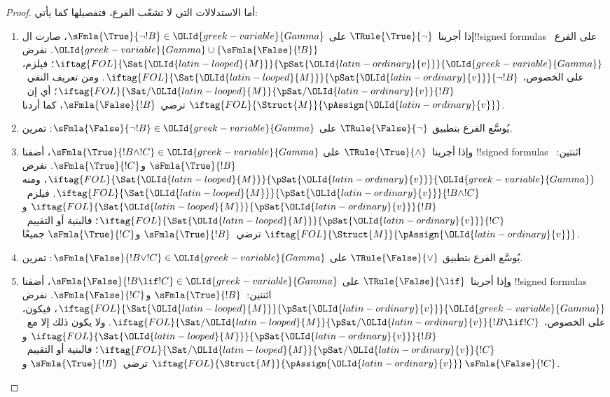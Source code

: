 \documentclass[../../../include/open-logic-section]{subfiles}
\begin{document}
\begin{proof}
أما الاستدلالات التي لا تشعّب الفرع، فتفصيلها كما يأتي:
\begin{enumerate}
\item إذا أجرينا~$\TRule{\True}{\lnot}$ على
  $\sFmla{\True}{\lnot !B} \in {\OLId{greek-variable}{Gamma}}$، صارت
  ال!!{signed formula}s على الفرع~${\OLId{greek-variable}{Gamma}} \cup
  \{\sFmla{\False}{!B}\}$. نفرض
  $\iftag{FOL}{\Sat{{\OLId{latin-looped}{M}}}}{\pSat{{\OLId{latin-ordinary}{v}}}}{{\OLId{greek-variable}{Gamma}}}$؛ فيلزم، على الخصوص،
  $\iftag{FOL}{\Sat{{\OLId{latin-looped}{M}}}}{\pSat{{\OLId{latin-ordinary}{v}}}}{\lnot !B}$.
  ومن تعريف النفي~$\iftag{FOL}{\Sat/{{\OLId{latin-looped}{M}}}}{\pSat/{{\OLId{latin-ordinary}{v}}}}{!B}$؛
  أي إن~$\iftag{FOL}{\Struct{M}}{\pAssign{{\OLId{latin-ordinary}{v}}}}$
  ترضي~$\sFmla{\False}{!B}$، كما أردنا.
\item يُوسَّع الفرع بتطبيق $\TRule{\False}{\lnot}$ على
  $\sFmla{\False}{\lnot !B} \in {\OLId{greek-variable}{Gamma}}$: تمرين.
\item وإذا أجرينا~$\TRule{\True}{\land}$ على
  $\sFmla{\True}{!B \land !C} \in {\OLId{greek-variable}{Gamma}}$،
  أضفنا !!{signed formula}s اثنتين:~$\sFmla{\True}{!B}$
  و$\sFmla{\True}{!C}$. نفرض
  $\iftag{FOL}{\Sat{{\OLId{latin-looped}{M}}}}{\pSat{{\OLId{latin-ordinary}{v}}}}{{\OLId{greek-variable}{Gamma}}}$، ومنه
  $\iftag{FOL}{\Sat{{\OLId{latin-looped}{M}}}}{\pSat{{\OLId{latin-ordinary}{v}}}}{!B \land !C}$.
  فيلزم~$\iftag{FOL}{\Sat{{\OLId{latin-looped}{M}}}}{\pSat{{\OLId{latin-ordinary}{v}}}}{!B}$ و
  $\iftag{FOL}{\Sat{{\OLId{latin-looped}{M}}}}{\pSat{{\OLId{latin-ordinary}{v}}}}{!C}$؛
  فالبنية أو التقييم~$\iftag{FOL}{\Struct{M}}{\pAssign{{\OLId{latin-ordinary}{v}}}}$
  ترضي~$\sFmla{\True}{!B}$ و$\sFmla{\True}{!C}$ جميعًا.
\item يُوسَّع الفرع بتطبيق $\TRule{\False}{\lor}$ على
  $\sFmla{\False}{!B \lor !C} \in {\OLId{greek-variable}{Gamma}}$: تمرين.
\item وإذا أجرينا~$\TRule{\False}{\lif}$ على
  $\sFmla{\False}{!B \lif !C} \in {\OLId{greek-variable}{Gamma}}$،
  أضفنا !!{signed formula}s اثنتين:~$\sFmla{\True}{!B}$
  و$\sFmla{\False}{!C}$. نفرض
  $\iftag{FOL}{\Sat{{\OLId{latin-looped}{M}}}}{\pSat{{\OLId{latin-ordinary}{v}}}}{{\OLId{greek-variable}{Gamma}}}$، فيكون، على الخصوص،
  $\iftag{FOL}{\Sat/{{\OLId{latin-looped}{M}}}}{\pSat/{{\OLId{latin-ordinary}{v}}}}{!B \lif !C}$.
  ولا يكون ذلك إلا مع~$\iftag{FOL}{\Sat{{\OLId{latin-looped}{M}}}}{\pSat{{\OLId{latin-ordinary}{v}}}}{!B}$
  و$\iftag{FOL}{\Sat/{{\OLId{latin-looped}{M}}}}{\pSat/{{\OLId{latin-ordinary}{v}}}}{!C}$؛
  فالبنية أو التقييم~$\iftag{FOL}{\Struct{M}}{\pAssign{{\OLId{latin-ordinary}{v}}}}$
  ترضي~$\sFmla{\True}{!B}$ و$\sFmla{\False}{!C}$.



\end{enumerate}
\end{proof}
\end{document}

